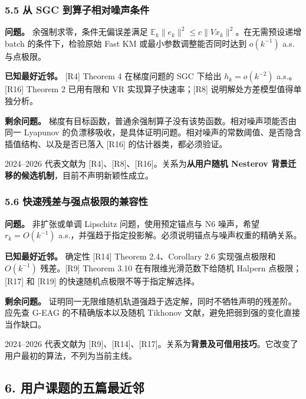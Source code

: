 \documentclass[
  chinese,
  10pt,
  a4paper,
]{article}
\begin{document}
\subsubsection{5.5 从 SGC
到算子相对噪声条件}\label{ux4ece-sgc-ux5230ux7b97ux5b50ux76f8ux5bf9ux566aux58f0ux6761ux4ef6}

\textbf{问题。} 余强制求零，条件无偏误差满足
\(\mathbb E_k\lVert e_k\rVert^2\le c\lVert Vx_k\rVert^2\)。在无需预设递增
batch 的条件下，检验原始 Fast KM 或最小参数调整能否同时达到
\(o(k^{-1})\) a.s. 与点极限。

\textbf{已知最好近邻。} {[}R4{]} Theorem 4 在梯度问题的 SGC 下给出
\(h_k=o(k^{-2})\) a.s.。{[}R16{]} Theorem 2 已用有限和 VR
实现算子快速率；{[}R8{]} 说明解处方差模型值得单独分析。

\textbf{剩余问题。}
梯度有目标函数，普通余强制算子没有该势函数。相对噪声项能否由同一
Lyapunov
的负漂移吸收，是具体证明问题。相对噪声的常数阈值、是否隐含插值结构、以及是否已落入
{[}R16{]} 的估计器类，都必须验证。

2024--2026 代表文献为
{[}R4{]}、{[}R8{]}、{[}R16{]}。关系为\textbf{从用户随机 Nesterov
背景迁移的候选机制}，目前不声明新颖性成立。

\subsubsection{5.6
快速残差与强点极限的兼容性}\label{ux5febux901fux6b8bux5deeux4e0eux5f3aux70b9ux6781ux9650ux7684ux517cux5bb9ux6027}

\textbf{问题。} 非扩张或单调 Lipschitz 问题，使用预定锚点与 N6
噪声，希望 \(r_k=O(k^{-1})\)
a.s.，并强趋于指定投影解。必须说明锚点与噪声权重的精确关系。

\textbf{已知最好近邻。} 确定性 {[}R14{]} Theorem 2.4、Corollary 2.6
实现强点极限和 \(O(k^{-1})\) 残差。{[}R9{]} Theorem 3.10
在有限维光滑范数下给随机 Halpern 点极限；{[}R17{]} 和 {[}R19{]}
的快速随机点极限不等于指定解选择。

\textbf{剩余问题。}
证明同一无限维随机轨道强趋于选定解，同时不牺牲声明的残差阶。应先查 G-EAG
的不精确版本以及随机 Tikhonov 文献，避免把弱到强的变化直接当作缺口。

2024--2026 代表文献为
{[}R9{]}、{[}R14{]}、{[}R17{]}。关系为\textbf{背景及可借用技巧}。它改变了用户最初的算法，不列为当前主线。

\subsection{6.
用户课题的五篇最近邻}\label{ux7528ux6237ux8bfeux9898ux7684ux4e94ux7bc7ux6700ux8fd1ux90bb}
\end{document}
